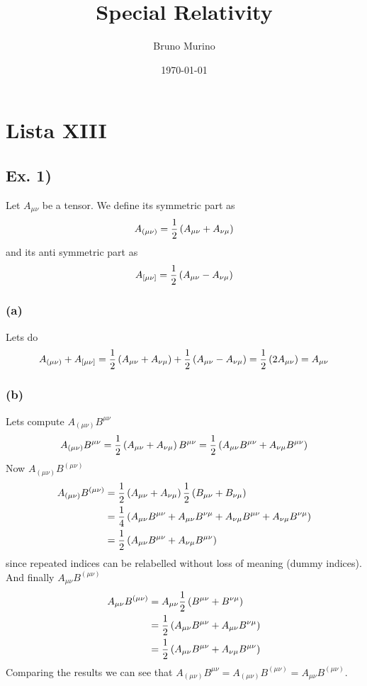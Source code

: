 \documentclass[oneside, 10pt, notitlepage]{book}
\title{Special Relativity} %
\author{Bruno Murino} %
\date{\today} %
\begin{document}
\chapter{Lista XIII}

\section*{Ex. 1)}

Let \(A_{\mu\nu}\) be a tensor. We define its symmetric part as
\begin{equation}
    A_{(\mu\nu)} = \frac{1}{2} \left(A_{\mu\nu}+A_{\nu\mu}\right)
\end{equation}
and its anti symmetric part as
\begin{equation}
    A_{[\mu\nu]} = \frac{1}{2} \left(A_{\mu\nu}-A_{\nu\mu}\right)
\end{equation}

\subsection*{(a)}
Lets do
\begin{equation}
    A_{(\mu\nu)}+A_{[\mu\nu]} = \frac{1}{2} \left(A_{\mu\nu}+A_{\nu\mu}\right)+\frac{1}{2} \left(A_{\mu\nu}-A_{\nu\mu}\right) = \frac{1}{2} \left(2 A_{\mu\nu}\right) = A_{\mu\nu}
\end{equation}

\subsection*{(b)}

Lets compute \(A_{(\mu\nu)}B^{\mu\nu}\)
\begin{equation}
    A_{(\mu\nu)}B^{\mu\nu} = \frac{1}{2} \left(A_{\mu\nu}+A_{\nu\mu}\right)B^{\mu\nu} = \frac{1}{2} \left(A_{\mu\nu}B^{\mu\nu} + A_{\nu\mu}B^{\mu\nu}\right)
\end{equation}
Now \(A_{(\mu\nu)}B^{(\mu\nu)}\)
\begin{equation}
\begin{split}
    A_{(\mu\nu)}B^{(\mu\nu)} &= \frac{1}{2} \left(A_{\mu\nu}+A_{\nu\mu}\right)\frac{1}{2} \left(B_{\mu\nu}+B_{\nu\mu}\right) \\
    &=\frac{1}{4}\left(A_{\mu\nu}B^{\mu\nu} + A_{\mu\nu}B^{\nu\mu} + A_{\nu\mu}B^{\mu\nu}+A_{\nu\mu}B^{\nu\mu}\right)\\
    &= \frac{1}{2} \left(A_{\mu\nu}B^{\mu\nu} + A_{\nu\mu}B^{\mu\nu}\right)
\end{split}
\end{equation}
since repeated indices can be relabelled without loss of meaning (dummy indices). And finally \(A_{\mu\nu}B^{(\mu\nu)}\)
\begin{equation}
\begin{split}
    A_{\mu\nu}B^{(\mu\nu)} &= A_{\mu\nu}\frac{1}{2} \left(B^{\mu\nu}+B^{\nu\mu}\right) \\
    &= \frac{1}{2} \left(A_{\mu\nu} B^{\mu\nu} + A_{\mu\nu}B^{\nu\mu}\right)\\
    &= \frac{1}{2} \left(A_{\mu\nu} B^{\mu\nu} + A_{\nu\mu}B^{\mu\nu}\right)
\end{split}
\end{equation}
Comparing the results we can see that \(A_{(\mu\nu)}B^{\mu\nu}=A_{(\mu\nu)}B^{(\mu\nu)}=A_{\mu\nu}B^{(\mu\nu)}\).
\end{document}
